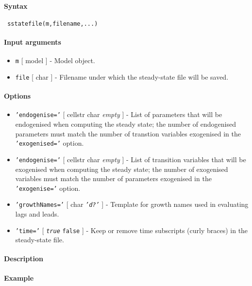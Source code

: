 


	\paragraph{Syntax}
 
 \begin{verbatim}
 sstatefile(m,filename,...)
 \end{verbatim}
 
 \paragraph{Input arguments}
 
 \begin{itemize}
 \item
   \texttt{m} {[} model {]} - Model object.
 \item
   \texttt{file} {[} char {]} - Filename under which the steady-state
   file will be saved.
 \end{itemize}
 
 \paragraph{Options}
 
 \begin{itemize}
 \item
   \texttt{'endogenise='} {[} cellstr \textbar{} char \textbar{}
   \emph{empty} {]} - List of parameters that will be endogenised when
   computing the steady state; the number of endogenised parameters must
   match the number of transtion variables exogenised in the
   \texttt{'exogenised='} option.
 \item
   \texttt{'endogenise='} {[} cellstr \textbar{} char \textbar{}
   \emph{empty} {]} - List of transition variables that will be
   exogenised when computing the steady state; the number of exogenised
   variables must match the number of parameters exogenised in the
   \texttt{'exogenise='} option.
 \item
   \texttt{'growthNames='} {[} char \textbar{} \emph{\texttt{'d?'}} {]} -
   Template for growth names used in evaluating lags and leads.
 \item
   \texttt{'time='} {[} \emph{\texttt{true}} \textbar{} \texttt{false}
   {]} - Keep or remove time subscripts (curly braces) in the
   steady-state file.
 \end{itemize}
 
 \paragraph{Description}
 
 \paragraph{Example}


